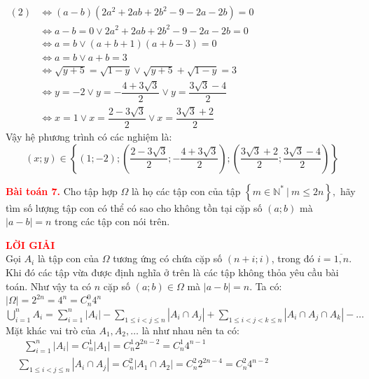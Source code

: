 \documentclass[a4paper, 12pt]{article}
\numberwithin{equation}{section}
\begin{document}
    $\begin{aligned}
        (2) &\iff (a-b)(2a^2 + 2ab + 2b^2 - 9 - 2a - 2b)=0 \\
            &\iff a - b = 0 \lor 2a^2 + 2ab + 2b^2 - 9 - 2a - 2b = 0\\
            &\iff a = b \lor (a+b+1)(a+b-3) = 0\\
            &\iff a = b \lor a+b = 3\\
            &\iff \sqrt{y+5} = \sqrt{1-y} \lor \sqrt{y+5}+\sqrt{1-y}=3\\
            &\iff y = -2 \lor y = -\dfrac{4+3\sqrt{3}}{2} \lor y = \dfrac{3\sqrt{3}-4}{2}\\
            &\iff x = 1 \lor x = \dfrac{2 - 3\sqrt{3}}{2} \lor x = \dfrac{3\sqrt{3} + 2}{2}
    \end{aligned}$\\
    Vậy hệ phương trình có các nghiệm là:
    \[(x; y) \in \left\{ \left(1 ; -2\right); \left(\dfrac{2 - 3\sqrt{3}}{2}; -\dfrac{4+3\sqrt{3}}{2}\right); \left(\dfrac{3\sqrt{3} + 2}{2}; \dfrac{3\sqrt{3}-4}{2}\right) \right\}\]
    \newpage
    \begin{BoxRed}
	\textbf{\textcolor{red}{Bài toán 7.}} 
          Cho tập hợp $\Omega$ là họ các tập con của tập $ \left\{m \in \mathbb{N^*} \ | \ m \leq 2n\right\},$ hãy tìm số lượng tập con có thể có sao cho không tồn tại cặp số $(a; b)$ mà $|a - b| = n$ trong các tập con nói trên.

	\end{BoxRed}
	\textbf{\textcolor{red}{LỜI GIẢI}} \\
    Gọi $A_i$ là tập con của $\Omega$ tương ứng có chứa cặp số $(n+i; i)$, trong đó $i = \overline{1, n}$.
    Khi đó các tập vừa được định nghĩa ở trên là các tập không thỏa yêu cầu bài toán. Như vậy ta có $n$ cặp số $(a; b) \in \Omega$ mà $|a - b| = n$. Ta có:\\
    $|\Omega| = 2^{2 n} = 4^n = C_n^0 4^n$ \\   
    $\bigcup\limits_{i=1}^n A_i = \sum\limits_{i=1}^n |A_i| - \sum\limits_{1\leq i < j \leq n}|A_i \cap A_j| + \sum\limits_{1\leq i < j < k \leq n} |A_i \cap A_j \cap A_k| - \dots$ \\
    Mặt khác vai trò của $A_1, A_2, \dots$ là như nhau nên ta có:\\
    $\begin{aligned}
       & \ \ \ \sum \limits_{i=1}^n |A_i| = C_n^1 |A_1| = C_n^1 2^{2n-2} = C_n^1 4^{n-1}\\
        &\sum \limits_{1\leq i < j \leq n}|A_i \cap A_j| = C_n^2 |A_1 \cap A_2| = C_n^2 2^{2n-4} = C_n^2 4^{n-2}   
    \end{aligned}$
   
\end{document}
